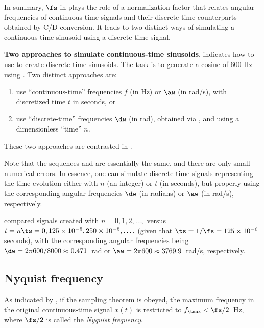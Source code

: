 In summary, $\fs$ in  plays the role of a normalization factor that relates angular frequencies of continuous-time signals and their discrete-time counterparts obtained by C/D conversion.
It leads to two distinct ways of simulating a continuous-time sinusoid using a discrete-time signal.


\bExample \textbf{Two approaches to simulate continuous-time sinusoids}.
 indicates how to use  to create discrete-time sinusoids. The task is to generate a cosine of 600 Hz using {\matlab}. Two distinct approaches are: 
\begin{enumerate}
\item use ``continuous-time'' frequencies $f$ (in Hz) or $\aw$ (in rad/s), with discretized time $t$ in seconds,
or
\item use ``discrete-time'' frequencies $\dw$ (in rad), obtained via , and using a dimensionless ``time'' $n$.
\end{enumerate}
These two approaches are contrasted in .

Note that the sequences  and  are essentially the same, and there are only small numerical errors.
In essence, one can simulate discrete-time signals representing the time evolution either with $n$ (an integer) or $t$ (in seconds), but properly using the corresponding angular frequencies $\dw$ (in radians) or $\aw$ (in rad/s), respectively.

 compared signals created with $n=0,1,2,\ldots,$ versus $t=n \ts=0, 125 \times 10^{-6}, 250 \times 10^{-6}, \ldots,$ (given that $\ts=1/\fs=125 \times 10^{-6}$ seconds), with the corresponding angular frequencies being $\dw=2 \pi 600 / 8000 \approx 0.471$~rad or $\aw= 2 \pi 600 \approx 3769.9$~rad/s, respectively.
\eExample

\subsection{Nyquist frequency}
\label{sec:nyquist_frequency}

As indicated by , if the sampling theorem is obeyed, the maximum frequency in the original continuous-time signal $x(t)$ is restricted to $f_\tmax < \fs/2	$~Hz, where $\fs/2$ is called the \emph{Nyquist frequency}. 



